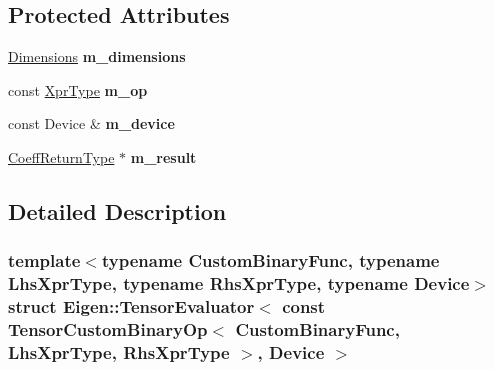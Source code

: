 \subsection*{Protected Attributes}
\begin{DoxyCompactItemize}
\item 
\mbox{\label{struct_eigen_1_1_tensor_evaluator_3_01const_01_tensor_custom_binary_op_3_01_custom_binary_func_0fea6836b993af318b6a5ab54d775368f_a1f0470affc1da4acdabc7c2afc96b4b4}} 
\hyperlink{struct_eigen_1_1_d_sizes}{Dimensions} {\bfseries m\+\_\+dimensions}
\item 
\mbox{\label{struct_eigen_1_1_tensor_evaluator_3_01const_01_tensor_custom_binary_op_3_01_custom_binary_func_0fea6836b993af318b6a5ab54d775368f_ac9fe6c8ed38b5786aa72784681000b42}} 
const \hyperlink{class_eigen_1_1_tensor_custom_binary_op}{Xpr\+Type} {\bfseries m\+\_\+op}
\item 
\mbox{\label{struct_eigen_1_1_tensor_evaluator_3_01const_01_tensor_custom_binary_op_3_01_custom_binary_func_0fea6836b993af318b6a5ab54d775368f_a8559cf014bd595ccb53c3b8ce99544a9}} 
const Device \& {\bfseries m\+\_\+device}
\item 
\mbox{\label{struct_eigen_1_1_tensor_evaluator_3_01const_01_tensor_custom_binary_op_3_01_custom_binary_func_0fea6836b993af318b6a5ab54d775368f_ad812318e3af26b9b16ff4fdbcd73c5de}} 
\hyperlink{group___sparse_core___module}{Coeff\+Return\+Type} $\ast$ {\bfseries m\+\_\+result}
\end{DoxyCompactItemize}


\subsection{Detailed Description}
\subsubsection*{template$<$typename Custom\+Binary\+Func, typename Lhs\+Xpr\+Type, typename Rhs\+Xpr\+Type, typename Device$>$\newline
struct Eigen\+::\+Tensor\+Evaluator$<$ const Tensor\+Custom\+Binary\+Op$<$ Custom\+Binary\+Func, Lhs\+Xpr\+Type, Rhs\+Xpr\+Type $>$, Device $>$}



